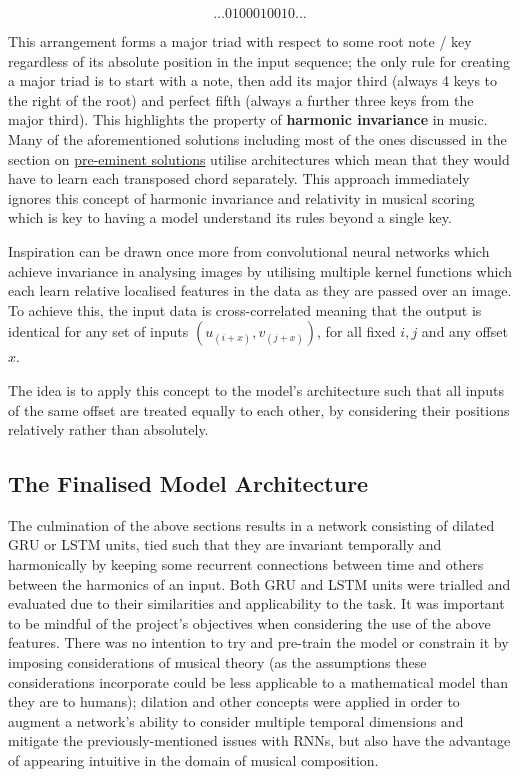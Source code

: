 \documentclass[12pt,]{article}
\begin{document}
\[... 0100010010 ...\]

This arrangement forms a major triad with respect to some root note /
key regardless of its absolute position in the input sequence; the only
rule for creating a major triad is to start with a note, then add its
major third (always 4 keys to the right of the root) and perfect fifth
(always a further three keys from the major third). This highlights the
property of \textbf{harmonic invariance} in music. Many of the
aforementioned solutions including most of the ones discussed in the
section on \protect\hyperlink{competitiveexistingsolutions}{pre-eminent
solutions} utilise architectures which mean that they would have to
learn each transposed chord separately. This approach immediately
ignores this concept of harmonic invariance and relativity in musical
scoring which is key to having a model understand its rules beyond a
single key.

Inspiration can be drawn once more from convolutional neural networks
which achieve invariance in analysing images by utilising multiple
kernel functions which each learn relative localised features in the
data as they are passed over an image. To achieve this, the input data
is cross-correlated meaning that the output is identical for any set of
inputs \((u_{(i + x)}, v_{(j+x)})\), for all fixed \(i,j\) and any
offset \(x\).

The idea is to apply this concept to the model's architecture such that
all inputs of the same offset are treated equally to each other, by
considering their positions relatively rather than absolutely.

\hypertarget{the-finalised-model-architecture}{%
\subsection{The Finalised Model
Architecture}\label{the-finalised-model-architecture}}

The culmination of the above sections results in a network consisting of
dilated GRU or LSTM units, tied such that they are invariant temporally
and harmonically by keeping some recurrent connections between time and
others between the harmonics of an input. Both GRU and LSTM units were
trialled and evaluated due to their similarities and applicability to
the task. It was important to be mindful of the project's objectives
when considering the use of the above features. There was no intention
to try and pre-train the model or constrain it by imposing
considerations of musical theory (as the assumptions these
considerations incorporate could be less applicable to a mathematical
model than they are to humans); dilation and other concepts were applied
in order to augment a network's ability to consider multiple temporal
dimensions and mitigate the previously-mentioned issues with RNNs, but
also have the advantage of appearing intuitive in the domain of musical
composition.
\end{document}
